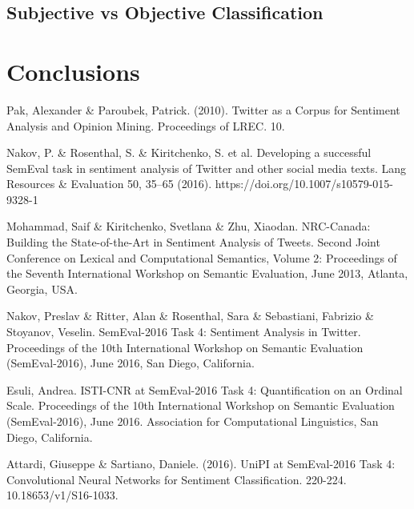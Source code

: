 \documentclass[11pt,twocolumn]{article}
\begin{document}
        \subsection{Subjective vs Objective Classification} %
        \label{sub:subjective_vs_objective_classification}


    \section{Conclusions} %
    \label{sec:conclusions}


    \begin{thebibliography}{9}
        Pak, Alexander \& Paroubek, Patrick. (2010). Twitter as a Corpus for Sentiment Analysis and Opinion
        Mining. Proceedings of LREC. 10.

        Nakov, P. \& Rosenthal, S. \& Kiritchenko, S. et al. Developing a successful SemEval task in sentiment
        analysis of Twitter and other social media texts. Lang Resources \& Evaluation 50, 35–65 (2016).
        https://doi.org/10.1007/s10579-015-9328-1

        Mohammad, Saif \& Kiritchenko, Svetlana \& Zhu, Xiaodan. NRC-Canada: Building the State-of-the-Art in
        Sentiment Analysis of Tweets. Second Joint Conference on Lexical and Computational Semantics,
        Volume 2: Proceedings of the Seventh International Workshop on Semantic Evaluation,
        June 2013, Atlanta, Georgia, USA.

        Nakov, Preslav \& Ritter, Alan \& Rosenthal, Sara \& Sebastiani, Fabrizio \& Stoyanov, Veselin.
        SemEval-2016 Task 4: Sentiment Analysis in Twitter. Proceedings of the 10th International Workshop on
        Semantic Evaluation (SemEval-2016), June 2016, San Diego, California.

        Esuli, Andrea. ISTI-CNR at SemEval-2016 Task 4: Quantification on an Ordinal Scale. Proceedings of the
        10th International Workshop on Semantic Evaluation (SemEval-2016), June 2016. Association for
        Computational Linguistics, San Diego, California.

        Attardi, Giuseppe \& Sartiano, Daniele. (2016). UniPI at SemEval-2016 Task 4: Convolutional Neural
        Networks for Sentiment Classification. 220-224. 10.18653/v1/S16-1033.


\end{thebibliography}
\end{document}
